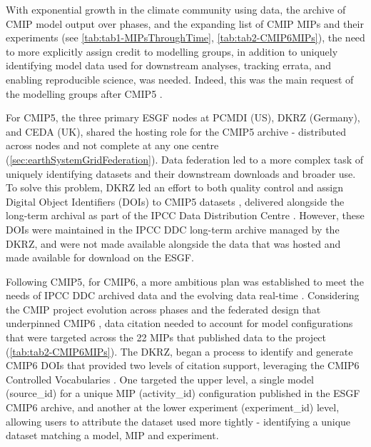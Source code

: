 \documentclass[manuscript]{copernicus}
\begin{document}
With exponential growth in the climate community using data, the archive of CMIP model output over phases, and the expanding list of CMIP MIPs and their experiments (see \autoref{tab:tab1-MIPsThroughTime}, \autoref{tab:tab2-CMIP6MIPs}), the need to more explicitly assign credit to modelling groups, in addition to uniquely identifying model data used for downstream analyses, tracking errata, and enabling reproducible science, was needed. Indeed, this was the main request of the modelling groups after CMIP5 \citep{williams_5th_2016}.

For CMIP5, the three primary ESGF nodes at PCMDI (US), DKRZ (Germany), and CEDA (UK), shared the hosting role for the CMIP5 archive - distributed across nodes and not complete at any one centre (\autoref{sec:earthSystemGridFederation}). Data federation led to a more complex task of uniquely identifying datasets and their downstream downloads and broader use. To solve this problem, DKRZ led an effort to both quality control and assign Digital Object Identifiers (DOIs) to CMIP5 datasets \citep[\autoref{sec:IPCC-DDC};][]{stockhause_quality_2012}, delivered alongside the long-term archival as part of the IPCC Data Distribution Centre \citep[IPCC DDC, \autoref{sec:IPCC-DDC};][]{stockhause_twenty-five_2022}. However, these DOIs were maintained in the IPCC DDC long-term archive managed by the DKRZ, and were not made available alongside the data that was hosted and made available for download on the ESGF.

Following CMIP5, for CMIP6, a more ambitious plan was established to meet the needs of IPCC DDC archived data and the evolving data real-time \citep{stockhause_cmip6_2017}. Considering the CMIP project evolution across phases and the federated design that underpinned CMIP6 \citep[see \autoref{sec:cmip6ProjectDesign};][]{eyring_overview_2016}, data citation needed to account for model configurations that were targeted across the 22 MIPs that published data to the project (\autoref{tab:tab2-CMIP6MIPs}). The DKRZ, began a process to identify and generate CMIP6 DOIs that provided two levels of citation support, leveraging the CMIP6 Controlled Vocabularies \citep[see \autoref{sec:CMIPCVs};][]{durack_cmip6_2024}. One targeted the upper level, a single model (source\_id) for a unique MIP (activity\_id) configuration published in the ESGF CMIP6 archive, and another at the lower experiment (experiment\_id) level, allowing users to attribute the dataset used more tightly - identifying a unique dataset matching a model, MIP and experiment.
\end{document}
